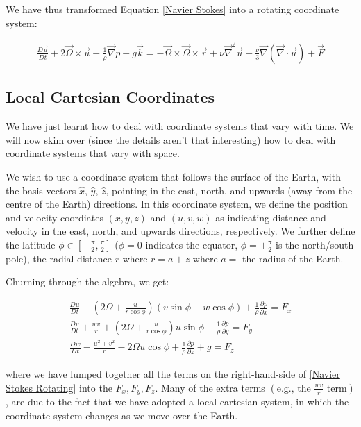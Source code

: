 We have thus transformed Equation \ref{Navier Stokes} into a rotating coordinate system:

\begin{align}
    \frac{D\vec{u}}{Dt}+2\vec{\Omega}\times\vec{u}+\frac{1}{\rho}\vec{\nabla}p+g\vec{k}=-\vec{\Omega}\times\vec{\Omega}\times\vec{r}+\nu\vec{\nabla}^2\vec{u}+\frac{\nu}{3}\vec{\nabla}(\vec{\nabla}\cdot\vec{u})+\vec{F}\label{Navier Stokes Rotating}
\end{align}

\subsection{Local Cartesian Coordinates}

We have just learnt how to deal with coordinate systems that vary with time. We will now skim over (since the details aren't that interesting) how to deal with coordinate systems that vary with space.

We wish to use a coordinate system that follows the surface of the Earth, with the basis vectors $\hat{x}$, $\hat{y}$, $\hat{z}$, pointing in the east, north, and upwards (away from the centre of the Earth) directions. In this coordinate system, we define the position and velocity coordiates $(x,y,z)$ and $(u,v,w)$ as indicating distance and velocity in the east, north, and upwards directions, respectively. We further define the latitude $\phi\in[-\frac{\pi}{2},\frac{\pi}{2}]$ ($\phi=0$ indicates the equator, $\phi=\pm\frac{\pi}{2}$ is the north/south pole), the radial distance $r$ where $r=a+z$ where $a=$ the radius of the Earth.

Churning through the algebra, we get:

\begin{align*}
    \frac{Du}{Dt}-\left( 2\Omega+\frac{u}{r\cos\phi} \right)\left( v\sin\phi-w\cos\phi \right)+\frac{1}{\rho}\frac{\partial p}{\partial x}
    =F_x\\
    \frac{Dv}{Dt}+\frac{wv}{r}+\left( 2\Omega+\frac{u}{r\cos\phi} \right)u\sin\phi+\frac{1}{\rho}\frac{\partial p}{\partial y}=F_y\\
    \frac{Dw}{Dt}-\frac{u^2+v^2}{r}-2\Omega u \cos\phi+\frac{1}{\rho}\frac{\partial p}{\partial z}+g=F_z
\end{align*}

\noindent where we have lumped together all the terms on the right-hand-side of \ref{Navier Stokes Rotating} into the $F_x, F_y, F_z$. Many of the extra terms $\left( \text{e.g., the } \frac{wv}{r} \text{ term}\right)$, are due to the fact that we have adopted a local cartesian system, in which the coordinate system changes as we move over the Earth. 

